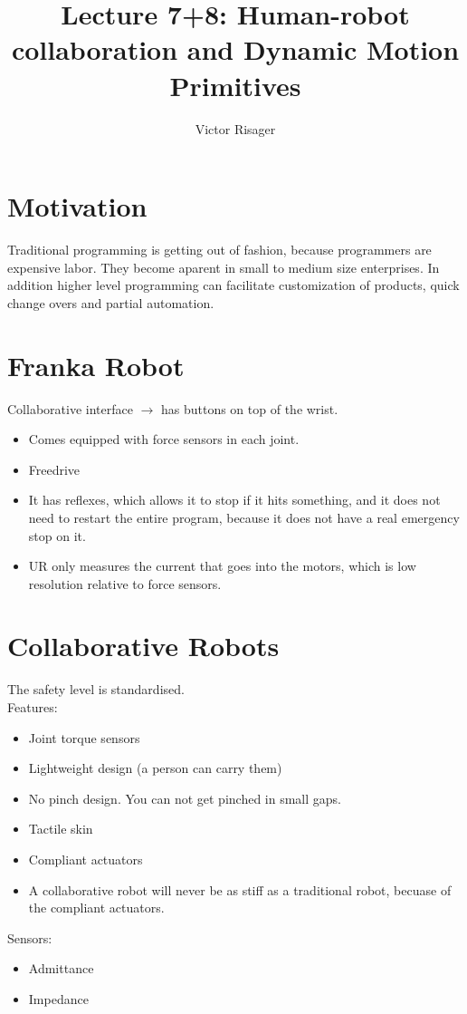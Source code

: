 \documentclass[a4paper]{article}
\title{Lecture 7+8: Human-robot collaboration and Dynamic Motion Primitives  \\
	\large }
\author{Victor Risager}
\begin{document}
\maketitle
\section{Motivation}
Traditional programming is getting out of fashion, because programmers are expensive  labor. They become aparent in small to medium size enterprises. In addition higher level programming can facilitate customization of products, quick change overs and partial automation.

\section{Franka Robot}
Collaborative interface $ \rightarrow $ has buttons on top of the wrist.
\begin{itemize}
	\item Comes equipped with force sensors in each joint.
	\item Freedrive
	\item It has reflexes, which allows it to stop if it hits something, and it does not need to restart the entire program, because it does not have a real emergency stop on it. 
	\item UR only measures the current that goes into the motors, which is low resolution relative to force sensors. 
\end{itemize}

\section{Collaborative Robots}
The safety level is standardised. \\
Features:
\begin{itemize}
	\item Joint torque sensors
	\item Lightweight design (a person can carry them)
	\item No pinch design. You can not get pinched in small gaps. 
	\item Tactile skin
	\item Compliant actuators 
	\item A collaborative robot will never be as stiff as a traditional robot, becuase of the compliant actuators.
\end{itemize}

Sensors:
\begin{itemize}
	\item Admittance
	\item Impedance
\end{itemize}
\end{document}

